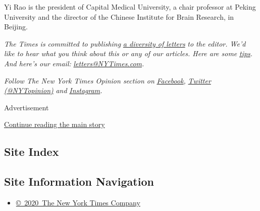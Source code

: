 Yi Rao is the president of Capital Medical University, a chair professor
at Peking University and the director of the Chinese Institute for Brain
Research, in Beijing.

\emph{The Times is committed to publishing}
\href{https://www.nytimes3xbfgragh.onion/2019/01/31/opinion/letters/letters-to-editor-new-york-times-women.html}{\emph{a
diversity of letters}} \emph{to the editor. We'd like to hear what you
think about this or any of our articles. Here are some}
\href{https://help.nytimes3xbfgragh.onion/hc/en-us/articles/115014925288-How-to-submit-a-letter-to-the-editor}{\emph{tips}}\emph{.
And here's our email:}
\href{mailto:letters@NYTimes.com}{\emph{letters@NYTimes.com}}\emph{.}

\emph{Follow The New York Times Opinion section on}
\href{https://www.facebookcorewwwi.onion/nytopinion}{\emph{Facebook}}\emph{,}
\href{http://twitter.com/NYTOpinion}{\emph{Twitter (@NYTopinion)}}
\emph{and}
\href{https://www.instagram.com/nytopinion/}{\emph{Instagram}}\emph{.}

Advertisement

\protect\hyperlink{after-bottom}{Continue reading the main story}

\hypertarget{site-index}{%
\subsection{Site Index}\label{site-index}}

\hypertarget{site-information-navigation}{%
\subsection{Site Information
Navigation}\label{site-information-navigation}}

\begin{itemize}
\tightlist
\item
  \href{https://help.nytimes3xbfgragh.onion/hc/en-us/articles/115014792127-Copyright-notice}{©~2020~The
  New York Times Company}
\end{itemize}

